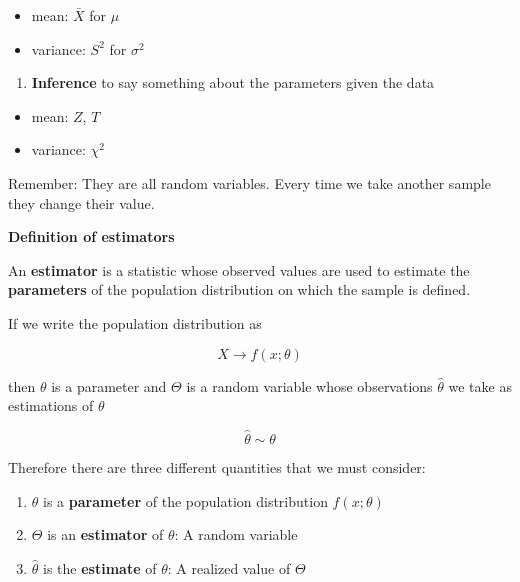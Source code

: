 \documentclass[
]{book}
\providecommand{\tightlist}{%
  \setlength{\itemsep}{0pt}\setlength{\parskip}{0pt}}
\begin{document}
\begin{itemize}
\tightlist
\item
  mean: \(\bar{X}\) for \(\mu\)
\item
  variance: \(S^2\) for \(\sigma^2\)
\end{itemize}

\begin{enumerate}
\def\labelenumi{\arabic{enumi}.}
\setcounter{enumi}{2}
\tightlist
\item
  \textbf{Inference} to say something about the parameters given the data
\end{enumerate}

\begin{itemize}
\tightlist
\item
  mean: \(Z\), \(T\)
\item
  variance: \(\chi^2\)
\end{itemize}

Remember: They are all random variables. Every time we take another sample they change their value.

\textbf{Definition of estimators}

An \textbf{estimator} is a statistic whose observed values are used to estimate the \textbf{parameters} of the population distribution on which the sample is defined.

If we write the population distribution as

\[X \rightarrow f(x; \theta)\]

then \(\theta\) is a parameter and \(\Theta\) is a random variable whose observations \(\hat{\theta}\) we take as estimations of \(\theta\)

\[\hat{\theta} \sim \theta\]

Therefore there are three different quantities that we must consider:

\begin{enumerate}
\def\labelenumi{\arabic{enumi}.}
\tightlist
\item
  \(\theta\) is a \textbf{parameter} of the population distribution \(f(x; \theta)\)
\item
  \(\Theta\) is an \textbf{estimator} of \(\theta\): A random variable
\item
  \(\hat{\theta}\) is the \textbf{estimate} of \(\theta\): A realized value of \(\Theta\)
\end{enumerate}
\end{document}
